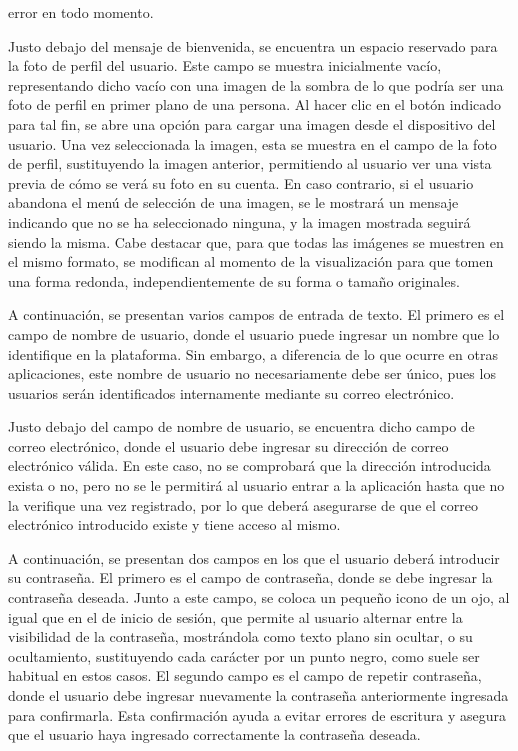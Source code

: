 \documentclass{article}
\begin{document}
error en todo momento.

Justo debajo del mensaje de bienvenida, se encuentra un espacio reservado para la foto de perfil del usuario. Este campo se muestra inicialmente vacío, representando dicho vacío con una imagen de la sombra de lo que podría ser una foto de perfil en primer plano de una persona. Al hacer clic en el botón indicado para tal fin, se abre una opción para cargar una imagen desde el dispositivo del usuario. Una vez seleccionada la imagen, esta se muestra en el campo de la foto de perfil, sustituyendo la imagen anterior, permitiendo al usuario ver una vista previa de cómo se verá su foto en su cuenta. En caso contrario, si el usuario abandona el menú de selección de una imagen, se le mostrará un mensaje indicando que no se ha seleccionado ninguna, y la imagen mostrada seguirá siendo la misma. Cabe destacar que, para que todas las imágenes se muestren en el mismo formato, se modifican al momento de la visualización para que tomen una forma redonda, independientemente de su forma o tamaño originales.

A continuación, se presentan varios campos de entrada de texto. El primero es el campo de nombre de usuario, donde el usuario puede ingresar un nombre que lo identifique en la plataforma. Sin embargo, a diferencia de lo que ocurre en otras aplicaciones, este nombre de usuario no necesariamente debe ser único, pues los usuarios serán identificados internamente mediante su correo electrónico.

Justo debajo del campo de nombre de usuario, se encuentra dicho campo de correo electrónico, donde el usuario debe ingresar su dirección de correo electrónico válida. En este caso, no se comprobará que la dirección introducida exista o no, pero no se le permitirá al usuario entrar a la aplicación hasta que no la verifique una vez registrado, por lo que deberá asegurarse de que el correo electrónico introducido existe y tiene acceso al mismo.

A continuación, se presentan dos campos en los que el usuario deberá introducir su contraseña. El primero es el campo de contraseña, donde se debe ingresar la contraseña deseada. Junto a este campo, se coloca un pequeño icono de un ojo, al igual que en el de inicio de sesión, que permite al usuario alternar entre la visibilidad de la contraseña, mostrándola como texto plano sin ocultar, o su ocultamiento, sustituyendo cada carácter por un punto negro, como suele ser habitual en estos casos. El segundo campo es el campo de repetir contraseña, donde el usuario debe ingresar nuevamente la contraseña anteriormente ingresada para confirmarla. Esta confirmación ayuda a evitar errores de escritura y asegura que el usuario haya ingresado correctamente la contraseña deseada.
\end{document}
